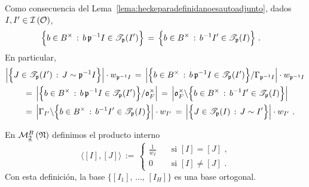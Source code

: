\begin{obsHeckeParaDefinidaNoEsAutoadjunto}
	\label{obs:heckeparadefinidanoesautoadjunto}
	Como consecuencia del Lema~\ref{lema:heckeparadefinidanoesautoadjunto},
	dados $I,I'\in\ideales{\cal O}$,
	\begin{align*}
		\Big\{b\in B^\times \,:\,
			b\,\frak p^{-1}I\in\mathscr T_{\frak p}(I')\Big\}
			& \,=\,
		\Big\{b\in B^\times \,:\,b^{-1}I'\in\mathscr T_{\frak p}(I)
			\Big\}
		\text{ .}
	\end{align*}
	En particular,
	\begin{align*}
		& \Big\vert\Big\{
			J\in\mathscr T_{\frak p}(I')\,:\,J\sim \frak p^{-1}I
				\Big\}\Big\vert\cdot w_{\frak p^{-1}I} \,=\,
		\Big\vert\Big\{b\in B^\times\,:\,
			b\,\frak p^{-1}I\in\mathscr T_{\frak p}(I')\Big\}/
			\Gamma_{\frak p^{-1}I}\Big\vert\cdot w_{\frak p^{-1}I}
				\\
		& \qquad \,=\,
		\Big\vert\Big\{b\in B^\times\,:\,
			b\,\frak p^{-1}I\in\mathscr T_{\frak p}(I')\Big\}/
			\oka F^\times\Big\vert \,=\,
		\Big\vert\oka F^\times\backslash\Big\{b\in B^\times\,:\,
			b^{-1}I'\in\mathscr T_{\frak p}(I)
				\Big\}\Big\vert \\
		& \qquad \,=\,
		\Big\vert\Gamma_{I'}\backslash\Big\{b\in B^\times\,:\,
			b^{-1}I'\in\mathscr T_{\frak p}(I)
				\Big\}\Big\vert\cdot w_{I'} \,=\,
		\Big\vert\Big\{J\in\mathscr T_{\frak p}(I)\,:\, J\sim I'
			\Big\}\Big\vert\cdot w_{I'}
		\text{ .}
	\end{align*}
\end{obsHeckeParaDefinidaNoEsAutoadjunto}

En $\modularH[B]{2}{\frak N}$ definimos el producto interno
\begin{equation}
	\label{eq:peterssonpesoparalelodosdefinida}
	\langle [I],[J]\rangle \,:=\,
	\begin{cases}
		\frac{1}{w_{I}} & \quad\text{si } [I] = [J]\text{ ,} \\
		0 & \quad\text{si } [I]\not = [J]\text{ .}
	\end{cases}
\end{equation}
%
Con esta definici\'{o}n, la base $\{[I_{1}],\,\dots,\,[I_{H}]\}$ es una base
ortogonal.

